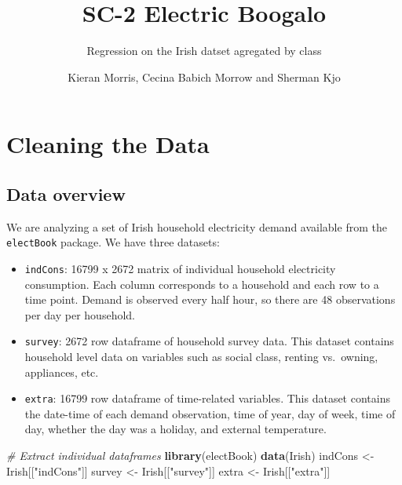 \documentclass[
]{article}
\title{SC-2 Electric Boogalo}
\subtitle{Regression on the Irish datset agregated by class}
\author{Kieran Morris, Cecina Babich Morrow and Sherman Kjo}
\date{}
\newenvironment{Shaded}{\begin{snugshade}}{\end{snugshade}}
\newcommand{\CommentTok}[1]{\textcolor[rgb]{0.56,0.35,0.01}{\textit{#1}}}
\newcommand{\FunctionTok}[1]{\textcolor[rgb]{0.13,0.29,0.53}{\textbf{#1}}}
\newcommand{\NormalTok}[1]{#1}
\newcommand{\OtherTok}[1]{\textcolor[rgb]{0.56,0.35,0.01}{#1}}
\newcommand{\StringTok}[1]{\textcolor[rgb]{0.31,0.60,0.02}{#1}}
\providecommand{\tightlist}{%
  \setlength{\itemsep}{0pt}\setlength{\parskip}{0pt}}
\begin{document}
\maketitle

{
\setcounter{tocdepth}{3}
\tableofcontents
}
\hypertarget{cleaning-the-data}{%
\section{Cleaning the Data}\label{cleaning-the-data}}

\hypertarget{data-overview}{%
\subsection{Data overview}\label{data-overview}}

We are analyzing a set of Irish household electricity demand available
from the \texttt{electBook} package. We have three datasets:

\begin{itemize}
\tightlist
\item
  \texttt{indCons}: 16799 x 2672 matrix of individual household
  electricity consumption. Each column corresponds to a household and
  each row to a time point. Demand is observed every half hour, so there
  are 48 observations per day per household.
\item
  \texttt{survey}: 2672 row dataframe of household survey data. This
  dataset contains household level data on variables such as social
  class, renting vs.~owning, appliances, etc.
\item
  \texttt{extra}: 16799 row dataframe of time-related variables. This
  dataset contains the date-time of each demand observation, time of
  year, day of week, time of day, whether the day was a holiday, and
  external temperature.
\end{itemize}

\begin{Shaded}
\begin{Highlighting}[]
\CommentTok{\# Extract individual dataframes}
\FunctionTok{library}\NormalTok{(electBook)}
\FunctionTok{data}\NormalTok{(Irish)}
\NormalTok{indCons }\OtherTok{\textless{}{-}}\NormalTok{ Irish[[}\StringTok{"indCons"}\NormalTok{]]}
\NormalTok{survey }\OtherTok{\textless{}{-}}\NormalTok{ Irish[[}\StringTok{"survey"}\NormalTok{]]}
\NormalTok{extra }\OtherTok{\textless{}{-}}\NormalTok{ Irish[[}\StringTok{"extra"}\NormalTok{]]}
\end{Highlighting}
\end{Shaded}
\end{document}
